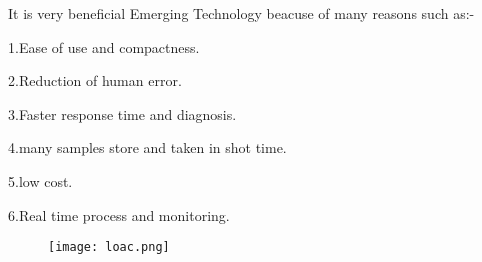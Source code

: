 \documentclass[12pt]{article}
\begin{document}
It is very beneficial Emerging Technology beacuse of many reasons such as:-

 1.Ease of use and compactness.
 
 2.Reduction of human error.
 
 3.Faster response time and diagnosis.
 
 4.many samples store and taken in shot time.
 
 5.low cost.
 
 6.Real time process and monitoring.
 
 


\begin{figure}[h]
\centering
\texttt{[image: loac.png]}
\end{figure}
\end{document}
